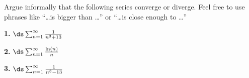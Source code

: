\small
Argue informally that the following series converge or diverge.  Feel free to use phrases like ``\dots is bigger than \dots'' or ``\dots is close enough to \dots''

\medskip \noindent \textbf{1.} \quad $\ds \sum_{n=1}^\infty \frac{1}{n^3+13}$

\vspace{22mm}
\medskip \noindent \textbf{2.} \quad $\ds \sum_{n=1}^\infty \frac{\ln(n)}{n}$

\vspace{22mm}
\medskip \noindent \textbf{3.} \quad $\ds \sum_{n=1}^\infty \frac{1}{n^3-13}$

